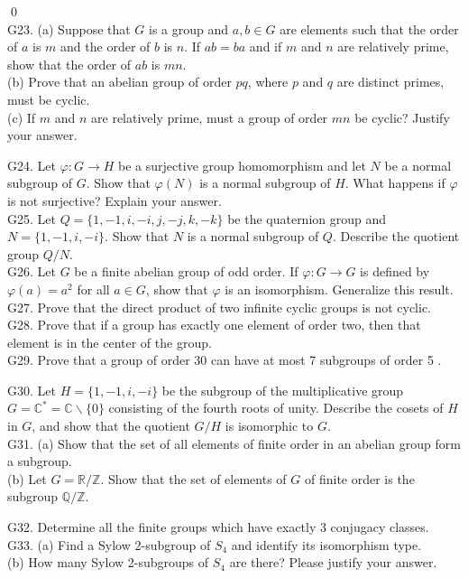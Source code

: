 \soln
\qed\\

G23. (a) Suppose that $G$ is a group and $a, b \in G$ are elements such that the order of $a$ is $m$ and the order of $b$ is $n$. If $a b=b a$ and if $m$ and $n$ are relatively prime, show that the order of $a b$ is $m n$.\\
(b) Prove that an abelian group of order $p q$, where $p$ and $q$ are distinct primes, must be cyclic.\\
(c) If $m$ and $n$ are relatively prime, must a group of order $m n$ be cyclic? Justify your answer.

G24. Let $\varphi: G \rightarrow H$ be a surjective group homomorphism and let $N$ be a normal subgroup of $G$. Show that $\varphi(N)$ is a normal subgroup of $H$. What happens if $\varphi$ is not surjective? Explain your answer.\\
G25. Let $Q=\{1,-1, i,-i, j,-j, k,-k\}$ be the quaternion group and $N=\{1,-1, i,-i\}$. Show that $N$ is a normal subgroup of $Q$. Describe the quotient group $Q / N$.\\
G26. Let $G$ be a finite abelian group of odd order. If $\varphi: G \rightarrow G$ is defined by $\varphi(a)=a^{2}$ for all $a \in G$, show that $\varphi$ is an isomorphism. Generalize this result.\\
G27. Prove that the direct product of two infinite cyclic groups is not cyclic.\\
G28. Prove that if a group has exactly one element of order two, then that element is in the center of the group.\\
G29. Prove that a group of order 30 can have at most 7 subgroups of order 5 .

G30. Let $H=\{1,-1, i,-i\}$ be the subgroup of the multiplicative group $G=\mathbb{C}^{*}=\mathbb{C} \backslash\{0\}$ consisting of the fourth roots of unity. Describe the cosets of $H$ in $G$, and show that the quotient $G / H$ is isomorphic to $G$.\\
G31. (a) Show that the set of all elements of finite order in an abelian group form a subgroup.\\
(b) Let $G=\mathbb{R} / \mathbb{Z}$. Show that the set of elements of $G$ of finite order is the subgroup $\mathbb{Q} / \mathbb{Z}$.

G32. Determine all the finite groups which have exactly 3 conjugacy classes.\\
G33. (a) Find a Sylow 2-subgroup of $S_{4}$ and identify its isomorphism type.\\
(b) How many Sylow 2-subgroups of $S_{4}$ are there? Please justify your answer.

